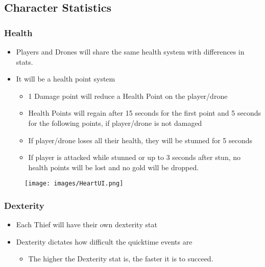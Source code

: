 \documentclass[10pt]{report}
\begin{document}
\subsection{Character Statistics}

\subsubsection{Health}

\begin{minipage}{.85\linewidth}
    \begin{itemize}
        \item Players and Drones will share the same health system with differences in stats.
        \item It will be a health point system
        \begin{itemize}
            \item 1 Damage point will reduce a Health Point on the player/drone
            \item Health Points will regain after 15 seconds for the first point and 5 seconds for the following points, if player/drone is not damaged
            \item If player/drone loses all their health, they will be stunned for 5 seconds
            \item If player is attacked while stunned or up to 3 seconds after stun, no health points will be lost and no gold will be dropped.    
        \end{itemize}
    \end{itemize}
\end{minipage} \hfill
\begin{minipage}{.13\linewidth}
    \begin{figure}[H]
        \centering
        \texttt{[image: images/HeartUI.png]}
        \caption{}
    \end{figure}
\end{minipage}

\subsubsection{Dexterity}

\begin{itemize}
    \item Each Thief will have their own dexterity stat
    \item Dexterity dictates how difficult the quicktime events are
    \begin{itemize}
        \item The higher the Dexterity stat is, the faster it is to succeed.    
    \end{itemize}
\end{itemize}
\end{document}

